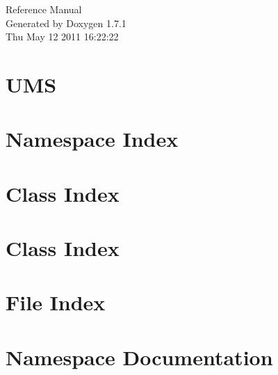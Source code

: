\documentclass[a4paper]{book}
\begin{document}
\hypersetup{pageanchor=false}
\begin{titlepage}
\vspace*{7cm}
\begin{center}
{\Large Reference Manual}\\
\vspace*{1cm}
{\large Generated by Doxygen 1.7.1}\\
\vspace*{0.5cm}
{\small Thu May 12 2011 16:22:22}\\
\end{center}
\end{titlepage}
\clearemptydoublepage
{}
\tableofcontents
\clearemptydoublepage
{}
\hypersetup{pageanchor=true}
\chapter{UMS}
\label{index}\hypertarget{index}{}
\chapter{Namespace Index}

\chapter{Class Index}

\chapter{Class Index}

\chapter{File Index}

\chapter{Namespace Documentation}

\end{document}
